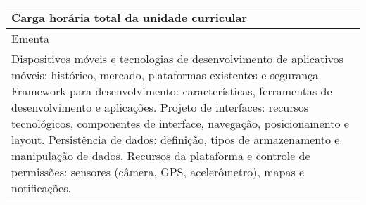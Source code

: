 \begin{quadro}[ht!]
\begin{tabular}{|p{3cm} p{2cm} p{3cm} p{2cm} p{3cm} p{2cm}|}
\multicolumn{5}{|p{13cm}|}{\cellcolor{blue1} Carga horária total da unidade curricular} & \multicolumn{1}{p{1cm}|}{\raggedleft 60	}\\\hline
\multicolumn{6}{|p{15cm}|}{\cellcolor{blue1} Ementa} \\\hline
\hline\multicolumn{6}{|p{15cm}|}{\scriptsize Dispositivos móveis e tecnologias de desenvolvimento de aplicativos móveis: histórico, mercado, plataformas existentes e segurança. Framework para desenvolvimento: características, ferramentas de desenvolvimento e aplicações. Projeto de interfaces: recursos tecnológicos, componentes de interface, navegação, posicionamento e layout. Persistência de dados: definição, tipos de armazenamento e manipulação de dados. Recursos da plataforma e controle de permissões: sensores (câmera, GPS, acelerômetro), mapas e notificações.}\\\hline
\hline
	\end{tabular}
\end{quadro}
